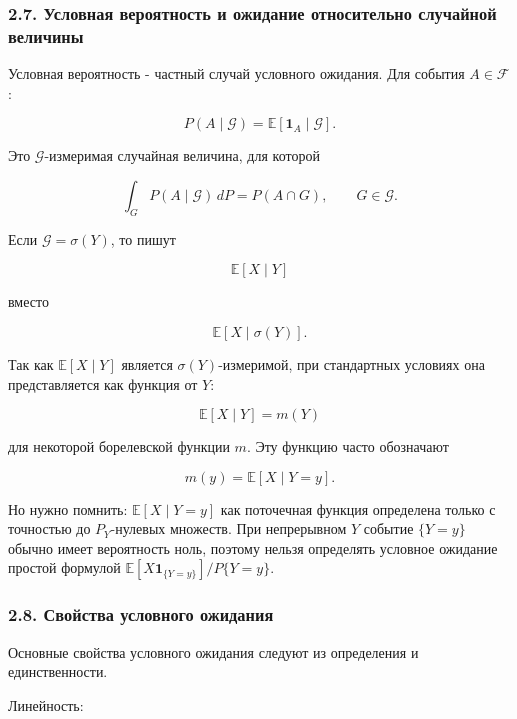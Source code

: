 \documentclass[
  11pt,
  a4paper,
]{article}
\begin{document}
\subsubsection{2.7. Условная вероятность и ожидание относительно
случайной
величины}\label{ux443ux441ux43bux43eux432ux43dux430ux44f-ux432ux435ux440ux43eux44fux442ux43dux43eux441ux442ux44c-ux438-ux43eux436ux438ux434ux430ux43dux438ux435-ux43eux442ux43dux43eux441ux438ux442ux435ux43bux44cux43dux43e-ux441ux43bux443ux447ux430ux439ux43dux43eux439-ux432ux435ux43bux438ux447ux438ux43dux44b}

Условная вероятность - частный случай условного ожидания. Для события
\(A\in\mathcal F\):

\[
P(A\mid\mathcal G)=\mathbb E[\mathbf 1_A\mid\mathcal G].
\]

Это \(\mathcal G\)-измеримая случайная величина, для которой

\[
\int_G P(A\mid\mathcal G)\,dP
=
P(A\cap G),
\qquad
G\in\mathcal G.
\]

Если \(\mathcal G=\sigma(Y)\), то пишут

\[
\mathbb E[X\mid Y]
\]

вместо

\[
\mathbb E[X\mid\sigma(Y)].
\]

Так как \(\mathbb E[X\mid Y]\) является \(\sigma(Y)\)-измеримой, при
стандартных условиях она представляется как функция от \(Y\):

\[
\mathbb E[X\mid Y]=m(Y)
\]

для некоторой борелевской функции \(m\). Эту функцию часто обозначают

\[
m(y)=\mathbb E[X\mid Y=y].
\]

Но нужно помнить: \(\mathbb E[X\mid Y=y]\) как поточечная функция
определена только с точностью до \(P_Y\)-нулевых множеств. При
непрерывном \(Y\) событие \(\{Y=y\}\) обычно имеет вероятность ноль,
поэтому нельзя определять условное ожидание простой формулой
\(\mathbb E[X\mathbf 1_{\{Y=y\}}]/P\{Y=y\}\).

\subsubsection{2.8. Свойства условного
ожидания}\label{ux441ux432ux43eux439ux441ux442ux432ux430-ux443ux441ux43bux43eux432ux43dux43eux433ux43e-ux43eux436ux438ux434ux430ux43dux438ux44f}

Основные свойства условного ожидания следуют из определения и
единственности.

Линейность:
\end{document}

